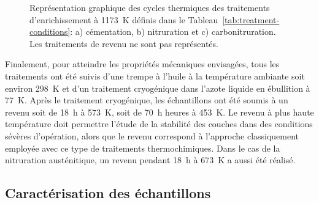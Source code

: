 \begin{figure}[!h]
  \centering{}
  
  \caption{\label{fig:heat-cycles}Représentation graphique des cycles thermiques des traitements d'enrichissement à \SI{1173}{\kelvin} définis dans le Tableau~\ref{tab:treatment-conditions}: a) cémentation, b) nitruration et c) carbonitruration. Les traitements de revenu ne sont pas représentés.}
\end{figure}

Finalement, pour atteindre les propriétés mécaniques envisagées, tous les traitements ont été suivis d'une trempe à l'huile à la température ambiante \textendash{} soit environ \SI{298}{\kelvin} \textendash{} et d'un traitement cryogénique dans l'azote liquide en ébullition \textendash{} à \SI{77}{\kelvin}. Après le traitement cryogénique, les échantillons ont été soumis à un revenu soit de \SI{18}{\hour} à \SI{573}{\kelvin}, soit de \SI{70}{\hour} heures à \SI{453}{\kelvin}. Le revenu à plus haute température doit permettre l'étude de la stabilité des couches dans des conditions sévères d'opération, alors que le revenu correspond à l'approche classiquement employée avec ce type de traitements thermochimiques. Dans le cas de la nitruration austénitique, un revenu pendant \SI{18}{\hour} à \SI{673}{\kelvin} a aussi été réalisé.

\subsection{Caractérisation des échantillons}
\label{sec:caracterisation_materiaux}

